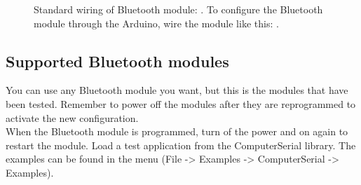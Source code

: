 		\begin{figure}[H]
		\hfill
		\caption{Standard wiring of Bluetooth module: \protect{\ref{fig:arduino_standard_wiring}}. To configure the Bluetooth module through the Arduino, wire the module like this: \protect{\ref{fig:arduino_configure_bluetooth}}.}
		\end{figure}

			\subsection{Supported Bluetooth modules}
			You can use any Bluetooth module you want, but this is the modules that have been tested. Remember to power off the modules after they are reprogrammed to activate the new configuration.\\
			
			When the Bluetooth module is programmed, turn of the power and on again to restart the module. Load a test application from the ComputerSerial library. The examples can be found in the menu (File -> Examples -> ComputerSerial -> Examples).
			
